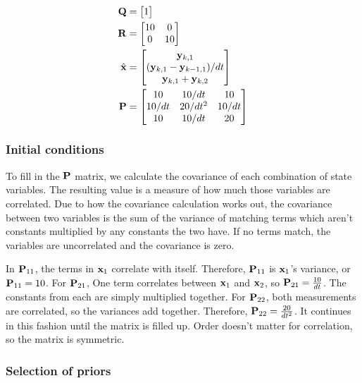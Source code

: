 \begin{align}
  \mathbf{Q} &= \begin{bmatrix}1\end{bmatrix} \\
  \mathbf{R} &=
  \begin{bmatrix}
    10 & 0 \\
    0 & 10
  \end{bmatrix} \\
  \hat{\mathbf{x}} &=
  \begin{bmatrix}
    \mathbf{y}_{k,1} \\
    (\mathbf{y}_{k,1} - \mathbf{y}_{k-1,1})/dt \\
    \mathbf{y}_{k,1} + \mathbf{y}_{k,2}
  \end{bmatrix} \\
  \mathbf{P} &=
  \begin{bmatrix}
    10 & 10/dt & 10 \\
    10/dt & 20/dt^2 & 10/dt \\
    10 & 10/dt & 20
  \end{bmatrix}
\end{align}

\subsubsection{Initial conditions}

To fill in the $\mathbf{P}$ matrix, we calculate the covariance of each combination
of \gls{state} variables. The resulting value is a measure of how much those
variables are correlated. Due to how the covariance calculation works out, the
covariance between two variables is the sum of the variance of matching terms
which aren't constants multiplied by any constants the two have. If no terms
match, the variables are uncorrelated and the covariance is zero.

In $\mathbf{P}_{11}$, the terms in $\mathbf{x}_1$ correlate with itself. Therefore,
$\mathbf{P}_{11}$ is $\mathbf{x}_1$'s variance, or $\mathbf{P}_{11} = 10$. For
$\mathbf{P}_{21}$, One term correlates between $\mathbf{x}_1$ and $\mathbf{x}_2$, so
$\mathbf{P}_{21} = \frac{10}{dt}$. The constants from each are simply multiplied
together. For $\mathbf{P}_{22}$, both measurements are correlated, so the variances
add together. Therefore, $\mathbf{P}_{22} = \frac{20}{dt^2}$. It continues in this
fashion until the matrix is filled up. Order doesn't matter for correlation, so
the matrix is symmetric.

\subsubsection{Selection of priors}


